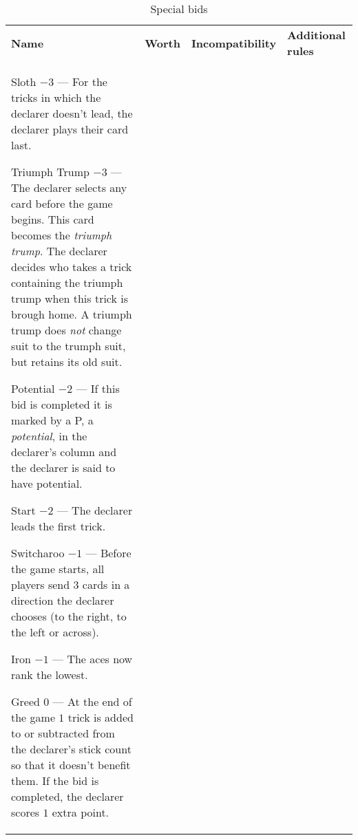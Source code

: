 %
%
%

\newcommand{\nonTrump}{\textnormal{non-trump bids}}

\begin{table}
	\caption{Special bids}\label{tab:specialBids}
	\begin{center}
		\begin{tabularx}{\textwidth}{lcp{3cm}|X}
			\textbf{Name} &
			\textbf{Worth} &
			\textbf{Incompatibility} &
			\textbf{Additional rules}
			\\[-3ex]

			\specialBidItem%
			{Sloth}
			{$-3$}
			{---}
			{%
				For the tricks in which the declarer doesn't lead, the declarer plays their card last.
			}

			\specialBidItem%
			{Triumph Trump}
			{$-3$}
			{---}
			{%
				The declarer selects any card before the game begins. This card becomes the \emph{triumph trump}. The declarer decides who takes a trick containing the triumph trump when this trick is brough home. A triumph trump does \emph{not} change suit to the trumph suit, but retains its old suit.
			}

			\specialBidItem%
			{Potential}
			{$-2$}
			{---}
			{%
				If this bid is completed it is marked by a P, a \emph{potential}, in the declarer's column and the declarer is said to have potential.
			}

			\specialBidItem%
			{Start}
			{$-2$}
			{---}
			{%
				The declarer leads the first trick.
			}

			\specialBidItem%
			{Switcharoo}
			{$-1$}
			{---}
			{%
				Before the game starts, all players send $3$ cards in a direction the declarer chooses (to the right, to the left or across).
			}

			\specialBidItem%
			{Iron}
			{$-1$}
			{---}
			{%
				The aces now rank the lowest.
			}

			\specialBidItem%
			{Greed}
			{$0$}
			{---}
			{%
				At the end of the game $1$ trick is added to or subtracted from the declarer's stick count so that it doesn't benefit them. If the bid is completed, the declarer scores $1$ extra point.
			}


\end{tabularx}
\end{center}
\end{table}
